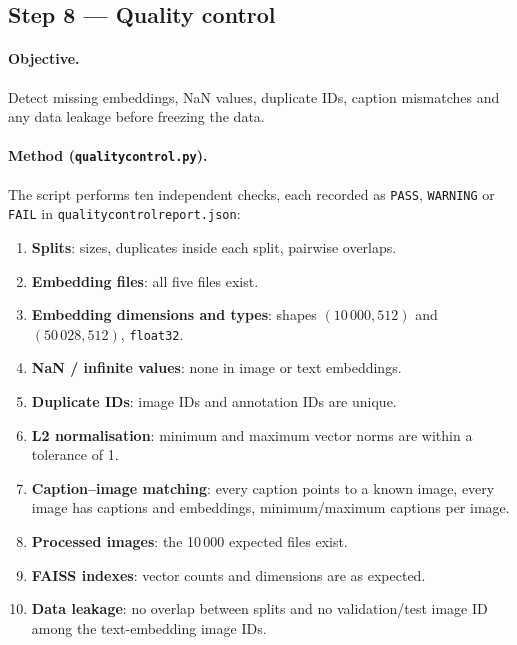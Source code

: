 \documentclass[11pt,a4paper]{article}
\renewcommand{\_}{\textunderscore\allowbreak{}}
\newcommand{\code}[1]{\texttt{#1}}
\begin{document}
\subsection{Step 8 --- Quality control}
\label{sec:qc}

\paragraph{Objective.} Detect missing embeddings, NaN values, duplicate IDs, caption mismatches and any data leakage before freezing the data.

\paragraph{Method (\code{quality\_control.py}).} The script performs ten independent checks, each recorded as \texttt{PASS}, \texttt{WARNING} or \texttt{FAIL} in \code{quality\_control\_report.json}:
\begin{enumerate}[nosep]
  \item \textbf{Splits}: sizes, duplicates inside each split, pairwise overlaps.
  \item \textbf{Embedding files}: all five files exist.
  \item \textbf{Embedding dimensions and types}: shapes $(10\,000,512)$ and $(50\,028,512)$, \code{float32}.
  \item \textbf{NaN / infinite values}: none in image or text embeddings.
  \item \textbf{Duplicate IDs}: image IDs and annotation IDs are unique.
  \item \textbf{L2 normalisation}: minimum and maximum vector norms are within a tolerance of 1.
  \item \textbf{Caption--image matching}: every caption points to a known image, every image has captions and embeddings, minimum/maximum captions per image.
  \item \textbf{Processed images}: the 10\,000 expected files exist.
  \item \textbf{FAISS indexes}: vector counts and dimensions are as expected.
  \item \textbf{Data leakage}: no overlap between splits and no validation/test image ID among the text-embedding image IDs.
\end{enumerate}
\end{document}
